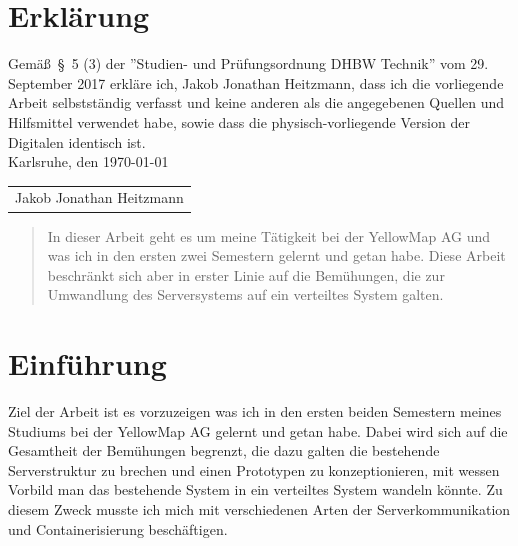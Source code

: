 \documentclass[12pt,a4paper]{article}
\begin{document}
\newpage


\section*{Erkl\"arung}

Gem\"a\ss\ \S\ 5 (3) der ''Studien- und Pr\"ufungsordnung DHBW Technik'' vom 29. September 2017 erkl\"are ich, Jakob Jonathan Heitzmann, dass ich die vorliegende Arbeit selbstst\"andig verfasst und keine anderen als die angegebenen Quellen und Hilfsmittel verwendet habe, sowie dass die physisch-vorliegende Version der Digitalen identisch ist.\\

\hspace*{0.5cm}
Karlsruhe, den \today

\vspace*{2cm}

\begin{tabular}{@{}l@{}}\hline
\rule{0pt}{2ex}
Jakob Jonathan Heitzmann
\end{tabular}
\newpage


\begin{abstract}
In dieser Arbeit geht es um meine Tätigkeit bei der YellowMap AG und was ich in den ersten zwei Semestern gelernt und getan habe. Diese Arbeit beschränkt sich aber in erster Linie auf die Bemühungen, die zur Umwandlung des Serversystems auf ein verteiltes System galten.
\end{abstract}
\newpage

\tableofcontents
\newpage


\section{Einf\"uhrung}
Ziel der Arbeit ist es vorzuzeigen was ich in den ersten beiden Semestern meines Studiums bei der YellowMap AG gelernt und getan habe. Dabei wird sich auf die Gesamtheit der Bemühungen begrenzt, die dazu galten die bestehende Serverstruktur zu brechen und einen Prototypen zu konzeptionieren, mit wessen Vorbild man das bestehende System in ein verteiltes System wandeln könnte. Zu diesem Zweck musste ich mich mit verschiedenen Arten der Serverkommunikation und Containerisierung beschäftigen.
\end{document}
